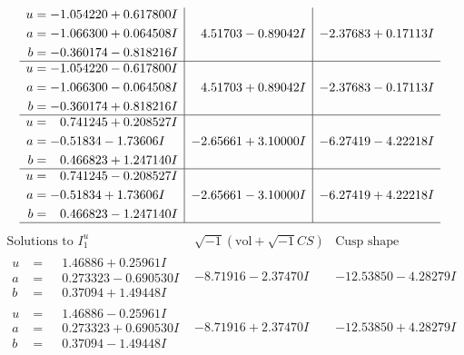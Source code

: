 \documentclass[1p]{elsarticle_modified}
\theoremstyle{definition}
\newcommand{\I}{\sqrt{-1}}
\begin{document}
$$\begin{array}{c|c|c}
\begin{aligned}
u &= -1.054220 + 0.617800 I \\
a &= -1.066300 + 0.064508 I \\
b &= -0.360174 - 0.818216 I\end{aligned}
 & \phantom{-}4.51703 - 0.89042 I & -2.37683 + 0.17113 I \\ \hline\begin{aligned}
u &= -1.054220 - 0.617800 I \\
a &= -1.066300 - 0.064508 I \\
b &= -0.360174 + 0.818216 I\end{aligned}
 & \phantom{-}4.51703 + 0.89042 I & -2.37683 - 0.17113 I \\ \hline\begin{aligned}
u &= \phantom{-}0.741245 + 0.208527 I \\
a &= -0.51834 - 1.73606 I \\
b &= \phantom{-}0.466823 + 1.247140 I\end{aligned}
 & -2.65661 + 3.10000 I & -6.27419 - 4.22218 I \\ \hline\begin{aligned}
u &= \phantom{-}0.741245 - 0.208527 I \\
a &= -0.51834 + 1.73606 I \\
b &= \phantom{-}0.466823 - 1.247140 I\end{aligned}
 & -2.65661 - 3.10000 I & -6.27419 + 4.22218 I\\
 \hline 
 \end{array}$$\newpage$$\begin{array}{c|c|c}  
\text{Solutions to }I^u_{1}& \I (\text{vol} + \sqrt{-1}CS) & \text{Cusp shape}\\
 \hline 
\begin{aligned}
u &= \phantom{-}1.46886 + 0.25961 I \\
a &= \phantom{-}0.273323 - 0.690530 I \\
b &= \phantom{-}0.37094 + 1.49448 I\end{aligned}
 & -8.71916 - 2.37470 I & -12.53850 - 4.28279 I \\ \hline\begin{aligned}
u &= \phantom{-}1.46886 - 0.25961 I \\
a &= \phantom{-}0.273323 + 0.690530 I \\
b &= \phantom{-}0.37094 - 1.49448 I\end{aligned}
 & -8.71916 + 2.37470 I & -12.53850 + 4.28279 I \\ \hline\begin{aligned}

\end{aligned}
\end{array}$$
\end{document}
